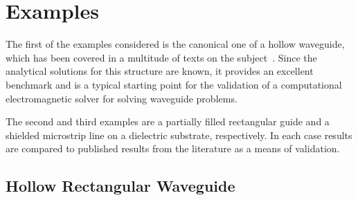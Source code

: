 \section{Examples}
\label{sec:Examples}

The first of the examples considered is the canonical one of a hollow
waveguide, which has been covered in a multitude of texts on the
subject~\cite{Dav2005, Jin2002, PelCoc1998, Poz2005}.  Since the
analytical solutions for this structure are known, it provides an
excellent benchmark and is a typical starting point for the validation
of a computational electromagnetic solver for solving waveguide
problems.

The second and third examples are a partially filled rectangular guide
and a shielded microstrip line on a dielectric substrate,
respectively. In each case results are compared to published results
from the literature as a means of validation.

\subsection{Hollow Rectangular Waveguide}

